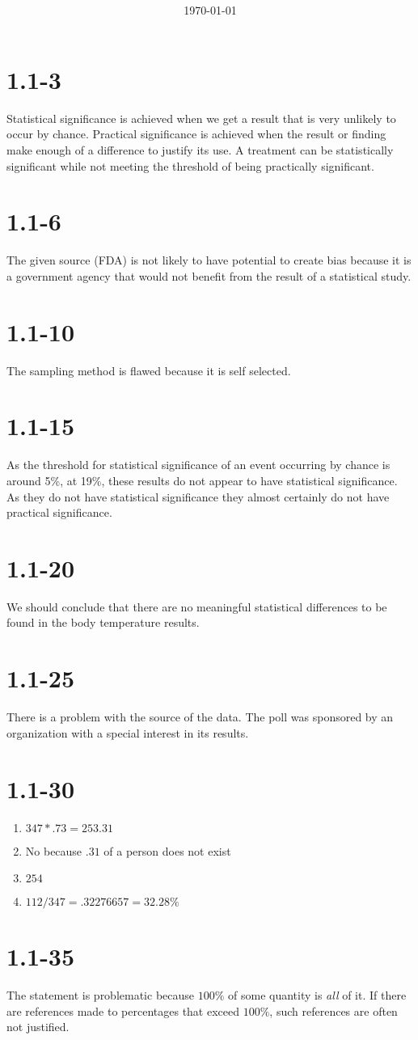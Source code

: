 \documentclass{article}
\title{\classdescription\ \\ \classname\ \\ $\ $ \\ \assignment}
\author{\authorname}
\date{\today}
\newcommand{\chapter}{1.1}
\newcommand{\problem}[1]{\vspace{5ex}\section*{\chapter-#1}}
\begin{document}
\maketitle

\problem{3}
Statistical significance is achieved when we get a result that is very unlikely to occur by chance. Practical significance is achieved when the result or finding make enough of a difference to justify its use. A treatment can be statistically significant while not meeting the threshold of being practically significant.


\problem{6}
The given source (FDA) is not likely to have potential to create bias because it is a government agency that would not benefit from the result of a statistical study.


\problem{10}
The sampling method is flawed because it is self selected.


\problem{15}

As the threshold for statistical significance of an event occurring by chance is around 5\%, at 19\%, these results do not appear to have statistical significance. As they do not have statistical significance they almost certainly do not have practical significance.

\problem{20}
We should conclude that there are no meaningful statistical differences to be found in the body temperature results.


\problem{25}
There is a problem with the source of the data. The poll was sponsored by an organization with a special interest in its results.


\problem{30}
\begin{enumerate}[label=\textbf{\alph*.}]
\item $347 * .73 = 253.31$
\item No because $.31$ of a person does not exist
\item $254$
  \item $112 / 347 = .32276657 = 32.28\%$
\end{enumerate}


\problem{35}
The statement is problematic because $100\%$ of some quantity is \textit{all} of it. If there are references made to percentages that exceed $100\%$, such references are often not justified.
\end{document}
